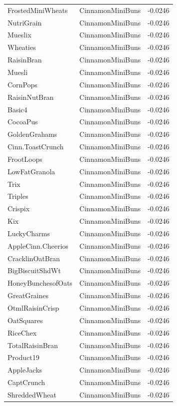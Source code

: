 \begin{table}[!htbp]
\begin{tabular}{lll}
FrostedMiniWheats & CinnamonMiniBuns & -0.0246
\\
NutriGrain & CinnamonMiniBuns & -0.0246
\\
Mueslix & CinnamonMiniBuns & -0.0246
\\
Wheaties & CinnamonMiniBuns & -0.0246
\\
RaisinBran & CinnamonMiniBuns & -0.0246
\\
Muesli & CinnamonMiniBuns & -0.0246
\\
CornPops & CinnamonMiniBuns & -0.0246
\\
RaisinNutBran & CinnamonMiniBuns & -0.0246
\\
Basic4 & CinnamonMiniBuns & -0.0246
\\
CocoaPus & CinnamonMiniBuns & -0.0246
\\
GoldenGrahams & CinnamonMiniBuns & -0.0246
\\
Cinn.ToastCrunch & CinnamonMiniBuns & -0.0246
\\
FrootLoops & CinnamonMiniBuns & -0.0246
\\
LowFatGranola & CinnamonMiniBuns & -0.0246
\\
Trix & CinnamonMiniBuns & -0.0246
\\
Triples & CinnamonMiniBuns & -0.0246
\\
Crispix & CinnamonMiniBuns & -0.0246
\\
Kix & CinnamonMiniBuns & -0.0246
\\
LuckyCharms & CinnamonMiniBuns & -0.0246
\\
AppleCinn.Cheerios & CinnamonMiniBuns & -0.0246
\\
CracklinOatBran & CinnamonMiniBuns & -0.0246
\\
BigBiscuitShdWt & CinnamonMiniBuns & -0.0246
\\
HoneyBunchesofOats & CinnamonMiniBuns & -0.0246
\\
GreatGraines & CinnamonMiniBuns & -0.0246
\\
OtmlRaisinCrisp & CinnamonMiniBuns & -0.0246
\\
OatSquares & CinnamonMiniBuns & -0.0246
\\
RiceChex & CinnamonMiniBuns & -0.0246
\\
TotalRaisinBran & CinnamonMiniBuns & -0.0246
\\
Product19 & CinnamonMiniBuns & -0.0246
\\
AppleJacks & CinnamonMiniBuns & -0.0246
\\
CaptCrunch & CinnamonMiniBuns & -0.0246
\\
ShreddedWheat & CinnamonMiniBuns & -0.0246

\end{tabular}
\end{table}
